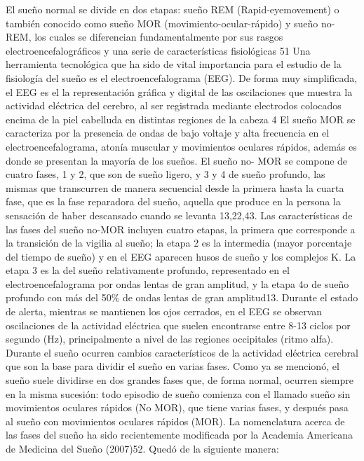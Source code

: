 El sueño normal se divide en dos etapas: sueño REM (Rapid-eyemovement) o también conocido como sueño MOR (movimiento-ocular-rápido) y sueño no-REM, los cuales se diferencian fundamentalmente por sus rasgos electroencefalográficos y una serie de características fisiológicas 51
Una herramienta tecnológica que ha sido de vital importancia para el estudio de la fisiología del sueño es el electroencefalograma (EEG). De forma muy simplificada, el EEG es el la representación gráfica y digital de las oscilaciones que muestra la actividad eléctrica del cerebro, al ser registrada mediante electrodos colocados encima de la piel cabelluda en distintas regiones de la cabeza 4
El sueño MOR se caracteriza por la presencia de ondas de bajo voltaje y alta frecuencia en el electroencefalograma, atonía muscular y movimientos oculares rápidos, además es donde se presentan la mayoría de los sueños. El sueño no- MOR se compone de cuatro fases, 1 y 2, que son de sueño ligero, y 3 y 4 de sueño profundo, las mismas que transcurren de manera secuencial desde la primera hasta la cuarta fase, que es la fase reparadora del sueño, aquella que produce en la persona la sensación de haber descansado cuando se levanta 13,22,43.
Las características de las fases del sueño no-MOR incluyen cuatro etapas, la primera que corresponde a la transición de la vigilia al sueño; la etapa 2 es la intermedia (mayor porcentaje del tiempo de sueño) y en el EEG aparecen husos de sueño y los complejos K. La etapa 3 es la del sueño relativamente profundo, representado en el electroencefalograma por ondas lentas de gran amplitud, y la etapa 4o de sueño profundo con más del 50\% de ondas lentas de gran amplitud13.
	Durante el estado de alerta, mientras se mantienen los ojos cerrados, en el EEG se observan oscilaciones de la actividad eléctrica que suelen encontrarse entre 8-13 ciclos por segundo (Hz), principalmente a nivel de las regiones occipitales (ritmo alfa). Durante el sueño ocurren cambios característicos de la actividad eléctrica cerebral que son la base para dividir el sueño en varias fases. Como ya se mencionó, el sueño suele dividirse en dos grandes fases que, de forma normal, ocurren siempre en la misma sucesión: todo episodio de sueño comienza con el llamado sueño sin movimientos oculares rápidos (No MOR), que tiene varias fases, y después pasa al sueño con movimientos oculares rápidos (MOR). La nomenclatura acerca de las fases del sueño ha sido recientemente modificada por la Academia Americana de Medicina del Sueño (2007)52. Quedó de la siguiente manera:

